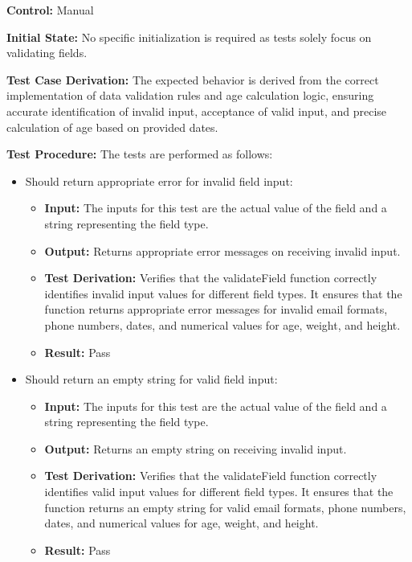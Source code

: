 \documentclass[12pt, titlepage]{article}
\begin{document}
\begin{enumerate}

  \textbf{Control:} Manual

  \textbf{Initial State:} No specific initialization is required as tests solely focus on validating fields.

  \textbf{Test Case Derivation:} The expected behavior is derived from the correct implementation of data validation rules and age calculation logic, ensuring accurate identification of invalid input, acceptance of valid input, and precise calculation of age based on provided dates.

  \textbf{Test Procedure:} The tests are performed as follows:

  \begin{itemize}
    \item Should return appropriate error for invalid field input:

    \begin{itemize}
      \item \textbf{Input:} The inputs for this test are the actual value of the field and a string representing the field type.   
      \item \textbf{Output:} Returns appropriate error messages on receiving invalid input.
      \item \textbf{Test Derivation:} Verifies that the validateField function correctly identifies invalid input values for different field types. It ensures that the function returns appropriate error messages for invalid email formats, phone numbers, dates, and numerical values for age, weight, and height.
      \item \textbf{Result:} Pass
    \end{itemize}

    \item Should return an empty string for valid field input:

    \begin{itemize}
      \item \textbf{Input:} The inputs for this test are the actual value of the field and a string representing the field type.   
      \item \textbf{Output:} Returns an empty string on receiving invalid input.
      \item \textbf{Test Derivation:} Verifies that the validateField function correctly identifies valid input values for different field types. It ensures that the function returns an empty string for valid email formats, phone numbers, dates, and numerical values for age, weight, and height.
      \item \textbf{Result:} Pass
    \end{itemize}


\end{itemize}
\end{enumerate}
\end{document}
